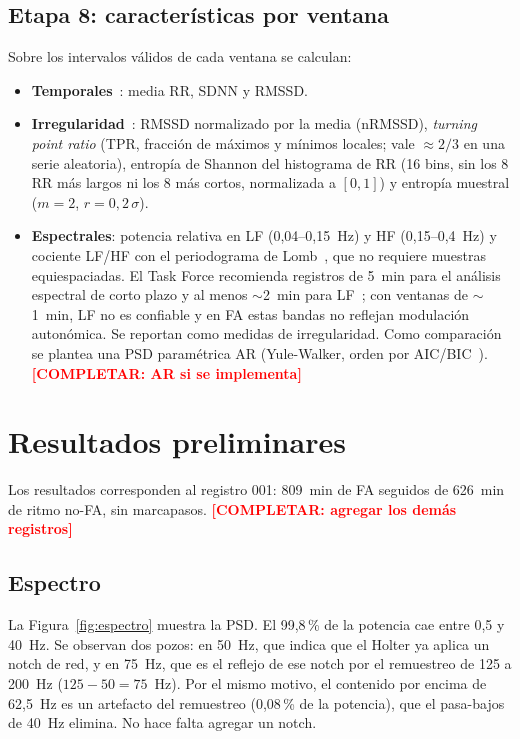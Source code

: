 \documentclass[11pt,a4paper]{article}
\newcommand{\completar}[1]{\textcolor{red}{\textbf{[COMPLETAR: #1]}}}
\begin{document}
\subsection{Etapa 8: características por ventana}
Sobre los intervalos válidos de cada ventana se calculan:
\begin{itemize}
  \item \textbf{Temporales}~\cite{taskforce1996}: media RR, SDNN y RMSSD.
  \item \textbf{Irregularidad}~\cite{dash2009,lake2011}: RMSSD normalizado por la media (nRMSSD), \textit{turning point ratio} (TPR, fracción de máximos y mínimos locales; vale $\approx 2/3$ en una serie aleatoria), entropía de Shannon del histograma de RR (16 bins, sin los 8 RR más largos ni los 8 más cortos, normalizada a $[0,1]$) y entropía muestral ($m=2$, $r = 0{,}2\,\sigma$).
  \item \textbf{Espectrales}: potencia relativa en LF (0,04--0,15~Hz) y HF (0,15--0,4~Hz) y cociente LF/HF con el periodograma de Lomb~\cite{laguna1998}, que no requiere muestras equiespaciadas. El Task Force recomienda registros de 5~min para el análisis espectral de corto plazo y al menos $\sim$2~min para LF~\cite{taskforce1996,shaffer2017}; con ventanas de $\sim$1~min, LF no es confiable y en FA estas bandas no reflejan modulación autonómica. Se reportan como medidas de irregularidad. Como comparación se plantea una PSD paramétrica AR (Yule-Walker, orden por AIC/BIC~\cite{boardman2002}). \completar{AR si se implementa}
\end{itemize}

\section{Resultados preliminares}
Los resultados corresponden al registro 001: 809~min de FA seguidos de 626~min de ritmo no-FA, sin marcapasos. \completar{agregar los demás registros}

\subsection{Espectro}\label{sec:res-espectro}
La Figura~\ref{fig:espectro} muestra la PSD. El 99,8\,\% de la potencia cae entre 0,5 y 40~Hz. Se observan dos pozos: en 50~Hz, que indica que el Holter ya aplica un notch de red, y en 75~Hz, que es el reflejo de ese notch por el remuestreo de 125 a 200~Hz ($125 - 50 = 75$~Hz). Por el mismo motivo, el contenido por encima de 62,5~Hz es un artefacto del remuestreo (0,08\,\% de la potencia), que el pasa-bajos de 40~Hz elimina. No hace falta agregar un notch.
\end{document}
